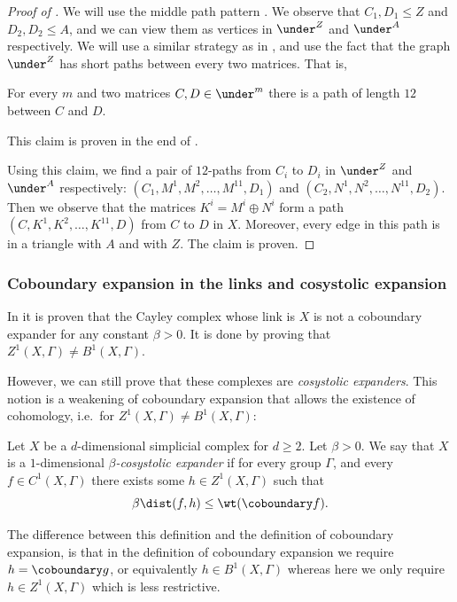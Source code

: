 \begin{proof}[Proof of ]
    We will use the middle path pattern . We observe that \(C_1,D_1 \leq Z\) and \(D_2,D_2 \leq A\), and we can view them as vertices in \(\under^{Z}\) and \(\under^{A}\) respectively. We will use a similar strategy as in , and use the fact that the graph \(\under^{Z}\) has short paths between every two matrices. That is,
    \begin{claim}\label{claim:short-paths-in-under-graph}
        For every \(m\) and two matrices \(C,D \in \under^m\) there is a path of length \(12\) between \(C\) and \(D\).
    \end{claim}
    This claim is proven in the end of . 
    
    Using this claim, we find a pair of \(12\)-paths from \(C_i\) to \(D_i\) in \(\under^{Z}\) and \(\under^{A}\) respectively: \((C_1,M^1,M^2,\dots,M^{11},D_1)\) and \((C_2,N^1,N^2,\dots,N^{11},D_2)\). Then we observe that the matrices \(K^i=M^i \oplus N^i\) form a path \((C,K^1,K^2,\dots,K^{11},D)\) from \(C\) to \(D\) in \(X\). Moreover, every edge in this path is in a triangle with \(A\) and with \(Z\). The claim is proven.
\end{proof}

\subsubsection{Coboundary expansion in the links and cosystolic expansion}
    In \cite{Golowich2023} it is proven that the Cayley complex whose link is \(X\) is not a coboundary expander for any constant \(\beta > 0\). It is done by proving that \(Z^1(X,\Gamma) \ne B^1(X,\Gamma)\).
    
    However, we can still prove that these complexes are \emph{cosystolic expanders}. This notion is a weakening of coboundary expansion that allows the existence of cohomology, i.e.\ for \(Z^1(X,\Gamma) \ne B^1(X,\Gamma)\):
    \begin{definition} \label{def:def-of-cosystolic-exp}
        Let \(X\) be a \(d\)-dimensional simplicial complex for \(d \geq 2\). Let \(\beta >0\). We say that \(X\) is a $1$-dimensional \emph{\(\beta\)-cosystolic expander} if for every group \(\Gamma\), and every \(f \in C^1(X,\Gamma)\) there exists some \(h \in Z^1(X,\Gamma)\) such that
    \begin{equation} \label{eq:def-of-cosyst-exp}
        \beta \dist(f,h) \leq \wt(\coboundary f).
    \end{equation}
    \end{definition}
    The difference between this definition and the definition of coboundary expansion, is that in the definition of coboundary expansion we require \(h=\coboundary g\), or equivalently \(h \in B^1(X,\Gamma)\) whereas here we only require \(h \in Z^1(X,\Gamma)\) which is less restrictive.


